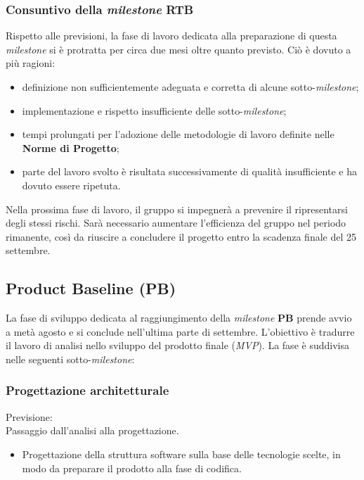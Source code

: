 \documentclass[12pt, a4paper]{article}
\begin{document}
{\subsubsection{Consuntivo della \textit{milestone} RTB}

Rispetto alle previsioni, la fase di lavoro dedicata alla preparazione di questa \textit{milestone} si è protratta per circa due mesi oltre quanto previsto. Ciò è dovuto a più ragioni:

\begin{itemize}
    \item definizione non sufficientemente adeguata e corretta di alcune sotto-\textit{milestone};

    \item implementazione e rispetto insufficiente delle sotto-\textit{milestone};

    \item tempi prolungati per l'adozione delle metodologie di lavoro definite nelle \textbf{Norme di Progetto};

    \item parte del lavoro svolto è risultata successivamente di qualità insufficiente e ha dovuto essere ripetuta.
\end{itemize}

Nella prossima fase di lavoro, il gruppo si impegnerà a prevenire il ripresentarsi degli stessi rischi. Sarà necessario aumentare l'efficienza del gruppo nel periodo rimanente, così da riuscire a concludere il progetto entro la scadenza finale del 25 settembre.


\subsection{Product Baseline (PB)}
La fase di sviluppo dedicata al raggiungimento della \textit{milestone} \textbf{PB} prende avvio a metà agosto e si conclude nell'ultima parte di settembre. L'obiettivo è tradurre il lavoro di analisi nello sviluppo del prodotto finale (\textit{MVP}). La fase è suddivisa nelle seguenti sotto-\textit{milestone}:

\subsubsection{Progettazione architetturale}
Previsione: \\
Passaggio dall'analisi alla progettazione.
\begin{itemize}
    \item Progettazione della struttura software sulla base delle tecnologie scelte, in modo da preparare il prodotto alla fase di codifica.


\end{itemize}}
\end{document}
